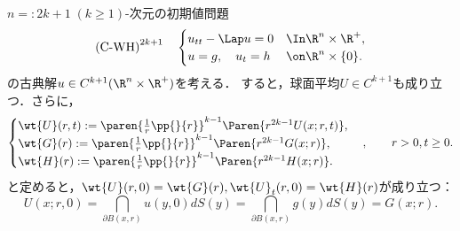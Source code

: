 \documentclass[uplatex,dvipdfmx]{jsreport}
\begin{document}
\begin{problem}
    $n=:2k+1\;(k\ge1)$-次元の初期値問題
    \[\text{(C-WH)}^{2k+1}\quad\begin{cases}
        u_{tt}-\Lap u=0&\In\R^n\times\R^+,\\
        u=g,\quad u_t=h&\on\R^n\times\{0\}.
    \end{cases}\]
    の古典解$u\in C^{k+1}(\R^n\times\R^+)$を考える．
    すると，球面平均$U\in C^{k+1}$も成り立つ．さらに，
    \[\begin{cases}
        \wt{U}(r,t):=\paren{\frac{1}{r}\pp{}{r}}^{k-1}\Paren{r^{2k-1}U(x;r,t)},\\
        \wt{G}(r):=\paren{\frac{1}{r}\pp{}{r}}^{k-1}\Paren{r^{2k-1}G(x;r)},\\
        \wt{H}(r):=\paren{\frac{1}{r}\pp{}{r}}^{k-1}\Paren{r^{2k-1}H(x;r)}.
    \end{cases},\qquad r>0,t\ge0.\]
    と定めると，$\wt{U}(r,0)=\wt{G}(r),\wt{U}_t(r,0)=\wt{H}(r)$が成り立つ：
    \[U(x;r,0)=\dint_{\partial B(x,r)}u(y,0)dS(y)=\dint_{\partial B(x,r)}g(y)dS(y)=G(x;r).\]
\end{problem}
\end{document}
